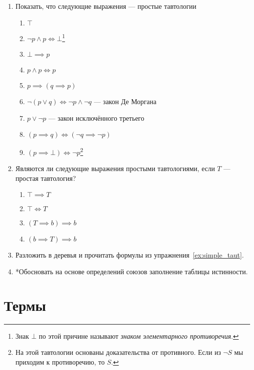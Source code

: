 \begin{enumerate}
  \item{}Показать, что следующие выражения --- простые тавтологии\label{ex:simple_taut}
  \begin{enumerate}
    \item{}$\top$
    \item{}$\lnot p\land p\iff\bot$\footnote{
    Знак $\bot$ по этой причине называют {\it знаком элементарного противоречия}.
    }
    \item{}$\bot \implies p$
    \item{}$p\land p\iff p$
    \item{}$p\implies (q\implies p)$
    \item{}$\lnot(p\lor q)\iff \lnot p\land \lnot q$
    --- закон Де Моргана
    \item{}$p\lor \lnot p$ --- закон исключённого третьего
    \item{}${(p\implies q)\iff (\lnot q\implies \lnot p)}$
    \item{}$(p\implies\bot)\iff \lnot p$\footnote{
      На этой тавтологии основаны
      доказательства от противного. Если из $\lnot S$ мы приходим
      к противоречию, то $S$.}
  \end{enumerate}
  \item{}Являются ли следующие выражения простыми тавтологиями,
  если $T$ --- простая тавтология?
  \begin{enumerate}
    \item{}$\top \implies T$
    \item{}$\top \iff T$
    \item{}$(T\implies b)\implies b$
    \item{}$(b\implies T)\implies b$
  \end{enumerate}
  \item{}Разложить в деревья и прочитать формулы из упражнения~\ref{ex:simple_taut}.
  \item{}*Обосновать на основе определений союзов заполнение таблицы истинности.
\end{enumerate}

\section{Термы}

